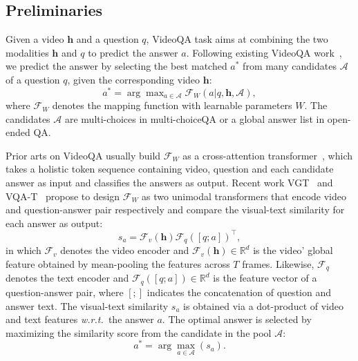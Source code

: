 \documentclass[sigconf]{acmart}
\newcommand{\wrt}{\emph{w.r.t.~}}
\begin{document}
\subsection{Preliminaries}
Given a video $\mathbf{h}$ and a question $q$, VideoQA task aims at combining the two modalities $\mathbf{h}$ and $q$ to predict the answer $a$. 
Following existing VideoQA work~\cite{li2022invariant, xiao2022hqga, xiao2022vgt}, we predict the answer by selecting the best matched $a^*$ from many candidates $\mathcal{A}$ of a question $q$, given the corresponding video $\mathbf{h}$:
\begin{equation}\label{Obj}
    a^* = \arg\max\nolimits_{a \in \mathcal{A}} {\mathcal{F}_W(a | q, \mathbf{h}, \mathcal{A})}, 
\end{equation}
where $\mathcal{F}_W$ denotes the mapping function with learnable parameters $W$. The candidates $\mathcal{A}$ are multi-choices in multi-choiceQA or a global answer list in open-ended QA. 

Prior arts on VideoQA usually build $\mathcal{F}_W$ as a cross-attention transformer~\cite{zhu2020actbert, lei2021less}, which takes a holistic token sequence containing video, question and each candidate answer as input and classifies the answers as output.
Recent work VGT~\cite{xiao2022vgt} and VQA-T~\cite{Yang_2021_ICCV} propose to design $\mathcal{F}_W$ as two unimodal transformers that encode video and question-answer pair respectively and compare the visual-text similarity for each answer as output:
\begin{equation}
  s_a = \mathcal{F}_v \left (\mathbf{h}  \right )  \mathcal{F}_q \left ( [q; a]\right )^\top,
\label{sim}
\end{equation}
in which $\mathcal{F}_v$ denotes the video encoder and $\mathcal{F}_v \left (\mathbf{h}  \right ) \in \mathbb{R}^d$ is the video' global feature obtained by mean-pooling the features across $T$ frames. Likewise, $\mathcal{F}_q$ denotes the text encoder and $\mathcal{F}_q \left ( [q; a]\right ) \in \mathbb{R}^d$ is the feature vector of a question-answer pair, where $[;]$ indicates the concatenation of question and answer text. 
The visual-text similarity $s_a$ is obtained via a dot-product of video and text features \wrt the answer $a$. The optimal answer is selected by maximizing the similarity score from the candidate in the pool $\mathcal{A}$:
\begin{equation}
    a^*=\arg \max_{a\in{\mathcal{A}}}(s_a).
\end{equation}
\end{document}
